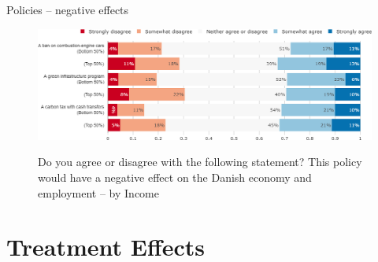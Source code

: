 \documentclass[aspectratio=169,9pt,dvipsnames]{beamer}
\begin{document}
\begin{frame}{Policies – negative effects}%
\vspace{-.5cm}
\begin{figure}[h!]
\caption{Do you agree or disagree with the following statement? This policy would have a negative effect on the Danish economy and employment -- by Income}
\includegraphics[width=.8\textwidth]{../figures/DK/policies_negative_effect_DK_inc.png} \\
\end{figure}
\end{frame}

\section{Treatment Effects}

\end{document}
